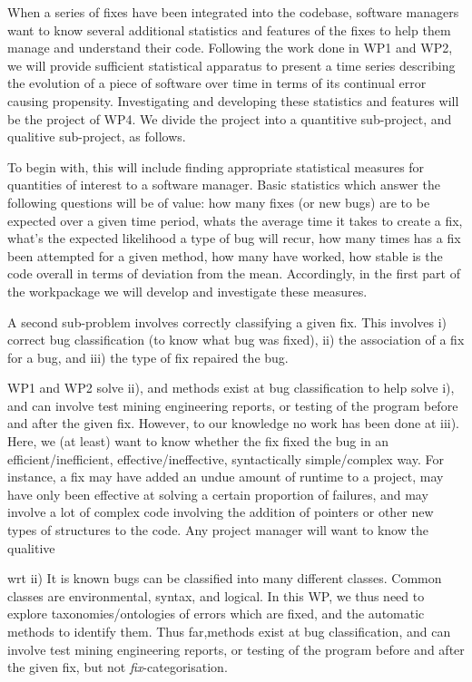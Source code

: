 When a series of fixes have been integrated into the codebase, software managers want to know several additional statistics and features of the fixes to help them manage and understand their code. 
Following the work done in WP1 and WP2, we will provide sufficient statistical apparatus to present a time series describing the evolution of a piece of software over time in terms of its continual error causing propensity.  Investigating and developing these statistics and features will be the project of WP4. We divide the project into a quantitive sub-project, and qualitive sub-project, as follows.

To begin with, this will include finding appropriate statistical measures for quantities of interest to a software manager. Basic statistics which answer the following questions will be of value: how many fixes (or new bugs) are to be expected over a given time period, whats the average time it takes to create a fix, what's the expected likelihood a type of bug will recur, how many times has a fix been attempted for a given method, how many have worked, how stable is the code overall in terms of deviation from the mean. Accordingly, in the first part of the workpackage we will develop and investigate these measures. 

A second sub-problem involves correctly classifying a given fix. This involves i) correct bug classification (to know what bug was fixed), ii) the 
association of a fix for a bug, and iii) the type of fix repaired the bug.

WP1 and WP2 solve ii), and methods exist at bug classification to help solve i), and can involve test mining engineering reports, or testing of the program before and after the given fix. However, to our knowledge no work has been done at iii). Here, we (at least) want to know whether the fix fixed the bug in an efficient/inefficient, effective/ineffective, syntactically simple/complex way. For instance, a fix may have added an undue amount of runtime to a project, may have only been effective at solving a certain proportion of failures, and may involve a lot of complex code involving the addition of pointers or other new types of structures to the code. Any project manager will want to know the qualitive 

wrt ii) It is known bugs can be classified into many different classes. Common classes are environmental, syntax, and logical. In this WP, we thus need to explore taxonomies/ontologies of errors which are fixed, and the automatic methods to identify them. Thus far,methods exist at bug classification, and can involve test mining engineering reports, or testing of the program before and after the given fix, but not \textit{fix}-categorisation.  